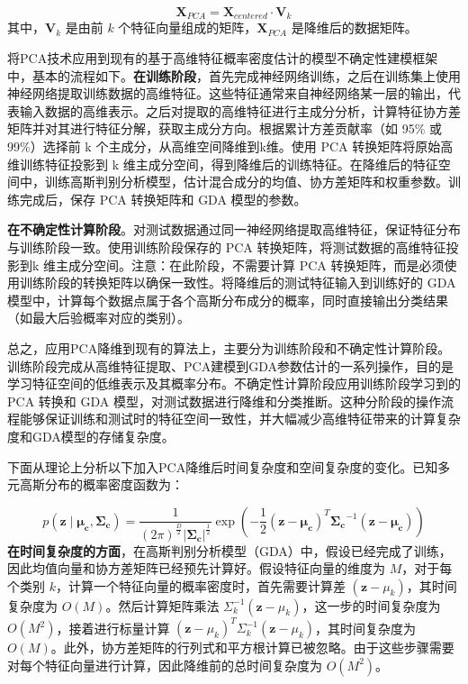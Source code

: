 \[
\mathbf{X}_{PCA} = \mathbf{X}_{centered} \cdot \mathbf{V}_k
\]
其中，\(\mathbf{V}_k\) 是由前 \(k\) 个特征向量组成的矩阵，\(\mathbf{X}_{PCA}\) 是降维后的数据矩阵。

将PCA技术应用到现有的基于高维特征概率密度估计的模型不确定性建模框架中，基本的流程如下。\textbf{在训练阶段}，首先完成神经网络训练，之后在训练集上使用神经网络提取训练数据的高维特征。这些特征通常来自神经网络某一层的输出，代表输入数据的高维表示。之后对提取的高维特征进行主成分分析，计算特征协方差矩阵并对其进行特征分解，获取主成分方向。根据累计方差贡献率（如 95\% 或 99\%）选择前 k 个主成分，从高维空间降维到k维。使用 PCA 转换矩阵将原始高维训练特征投影到 k 维主成分空间，得到降维后的训练特征。在降维后的特征空间中，训练高斯判别分析模型，估计混合成分的均值、协方差矩阵和权重参数。训练完成后，保存 PCA 转换矩阵和 GDA 模型的参数。

\textbf{在不确定性计算阶段}。对测试数据通过同一神经网络提取高维特征，保证特征分布与训练阶段一致。使用训练阶段保存的 PCA 转换矩阵，将测试数据的高维特征投影到k 维主成分空间。注意：在此阶段，不需要计算 PCA 转换矩阵，而是必须使用训练阶段的转换矩阵以确保一致性。将降维后的测试特征输入到训练好的 GDA 模型中，计算每个数据点属于各个高斯分布成分的概率，同时直接输出分类结果（如最大后验概率对应的类别）。

总之，应用PCA降维到现有的算法上，主要分为训练阶段和不确定性计算阶段。训练阶段完成从高维特征提取、PCA建模到GDA参数估计的一系列操作，目的是学习特征空间的低维表示及其概率分布。不确定性计算阶段应用训练阶段学习到的 PCA 转换和 GDA 模型，对测试数据进行降维和分类推断。这种分阶段的操作流程能够保证训练和测试时的特征空间一致性，并大幅减少高维特征带来的计算复杂度和GDA模型的存储复杂度。



下面从理论上分析以下加入PCA降维后时间复杂度和空间复杂度的变化。已知多元高斯分布的概率密度函数为：

\[
p(\mathbf{z} \mid \boldsymbol{\mu_c}, \boldsymbol{\Sigma_c}) = \frac{1}{(2\pi)^{\frac{D}{2}} \left| \boldsymbol{\Sigma_c} \right|^{\frac{1}{2}}} \exp \left( -\frac{1}{2} (\mathbf{z} - \boldsymbol{\mu_c})^T \boldsymbol{\Sigma_c}^{-1} (\mathbf{z} - \boldsymbol{\mu_c}) \right)
\]
\textbf{在时间复杂度的方面}，在高斯判别分析模型（GDA）中，假设已经完成了训练，因此均值向量和协方差矩阵已经预先计算好。假设特征向量的维度为 \( M \)，对于每个类别 \( k \)，计算一个特征向量的概率密度时，首先需要计算差 \( (\mathbf{z} - \mu_k) \)，其时间复杂度为 \( O(M) \)。然后计算矩阵乘法 \( \Sigma_k^{-1} (\mathbf{z} - \mu_k) \)，这一步的时间复杂度为 \( O(M^2) \)，接着进行标量计算 \( (\mathbf{z} - \mu_k)^T \Sigma_k^{-1} (\mathbf{z} - \mu_k) \)，其时间复杂度为 \( O(M) \)。此外，协方差矩阵的行列式和平方根计算已被忽略。由于这些步骤需要对每个特征向量进行计算，因此降维前的总时间复杂度为 \( O(M^2) \)。

